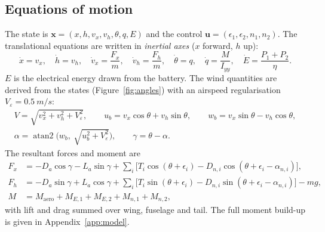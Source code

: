 \documentclass[11pt,a4paper]{article}
\begin{document}
\subsection{Equations of motion}\label{sec:eom}
The state is $\mathbf{x} = (x, h, v_x, v_h, \theta, q, E)$ and the control
$\mathbf{u} = (\epsilon_1, \epsilon_2, n_1, n_2)$. The translational equations are written in
\emph{inertial axes} ($x$ forward, $h$ up):
\begin{equation}
\dot x = v_x, \quad \dot h = v_h, \quad
\dot v_x = \frac{F_x}{m}, \quad \dot v_h = \frac{F_h}{m}, \quad
\dot\theta = q, \quad \dot q = \frac{M}{I_{yy}}, \quad
\dot E = \frac{P_1 + P_2}{\eta}.
\label{eq:eom}
\end{equation}
$E$ is the electrical energy drawn from the battery. The wind quantities are derived from
the states (Figure~\ref{fig:angles}) with an airspeed regularisation $V_\varepsilon = \SI{0.5}{m/s}$:
\begin{gather}
V = \sqrt{v_x^2 + v_h^2 + V_\varepsilon^2}, \qquad
u_b = v_x\cos\theta + v_h\sin\theta, \qquad w_b = v_x\sin\theta - v_h\cos\theta, \\
\alpha = \operatorname{atan2}\!\big(w_b,\ \sqrt{u_b^2 + V_\varepsilon^2}\big), \qquad
\gamma = \theta - \alpha .
\end{gather}
The resultant forces and moment are
\begin{align}
F_x &= -D_a\cos\gamma - L_a\sin\gamma
 + \textstyle\sum_i \big[ T_i\cos(\theta+\epsilon_i) - D_{n,i}\cos(\theta+\epsilon_i-\alpha_{n,i}) \big], \\
F_h &= -D_a\sin\gamma + L_a\cos\gamma
 + \textstyle\sum_i \big[ T_i\sin(\theta+\epsilon_i) - D_{n,i}\sin(\theta+\epsilon_i-\alpha_{n,i}) \big] - m g, \\
M &= M_{\text{aero}} + M_{E,1} + M_{E,2} + M_{n,1} + M_{n,2},
\end{align}
with lift and drag summed over wing, fuselage and tail. The full moment build-up is given in
Appendix~\ref{app:model}.
\end{document}
